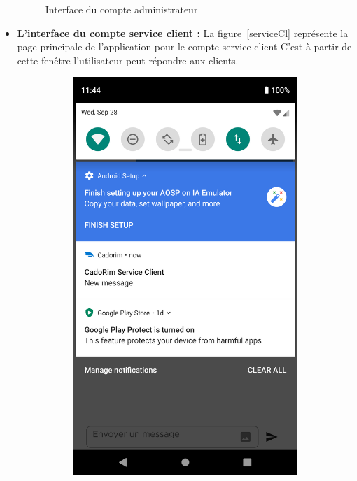 \begin{itemize}[label=$\ast$]
\begin{figure}
	\caption{Interface du compte administrateur
}
\label{Home}
\end{figure}
\newpage
\item \textbf{L’interface du compte service client
	:} 
La figure~\ref{serviceCl} représente la page principale de l’application pour le compte service client C’est à partir de cette fenêtre l'utilisateur peut répondre aux clients.
\begin{figure}
	\centering
\begin{subfigure}{0.3\textwidth}
	\includegraphics[width=\hsize, valign=m ]{./Template LaTeX/Images/From_emu/a.png}

\end{subfigure}
\end{figure}
\end{itemize}
